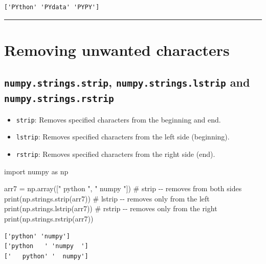 \documentclass[
  english,
  letterpaper,
  DIV=11,
  numbers=noendperiod]{scrreprt}
\newenvironment{Shaded}{\begin{snugshade}}{\end{snugshade}}
\newcommand{\BuiltInTok}[1]{\textcolor[rgb]{0.00,0.23,0.31}{#1}}
\newcommand{\CommentTok}[1]{\textcolor[rgb]{0.37,0.37,0.37}{#1}}
\newcommand{\ImportTok}[1]{\textcolor[rgb]{0.00,0.46,0.62}{#1}}
\newcommand{\NormalTok}[1]{\textcolor[rgb]{0.00,0.23,0.31}{#1}}
\newcommand{\OperatorTok}[1]{\textcolor[rgb]{0.37,0.37,0.37}{#1}}
\newcommand{\StringTok}[1]{\textcolor[rgb]{0.13,0.47,0.30}{#1}}
\providecommand{\tightlist}{%
  \setlength{\itemsep}{0pt}\setlength{\parskip}{0pt}}
\begin{document}
\begin{verbatim}
['PYthon' 'PYdata' 'PYPY']
\end{verbatim}

\begin{center}\rule{0.5\linewidth}{0.5pt}\end{center}

\section{Removing unwanted
characters}\label{removing-unwanted-characters}

\subsection{\texorpdfstring{\texttt{numpy.strings.strip},
\texttt{numpy.strings.lstrip} and
\texttt{numpy.strings.rstrip}}{numpy.strings.strip, numpy.strings.lstrip and numpy.strings.rstrip}}\label{numpy.strings.strip-numpy.strings.lstrip-and-numpy.strings.rstrip}

\begin{itemize}
\tightlist
\item
  \texttt{strip}: Removes specified characters from the beginning and
  end.
\item
  \texttt{lstrip}: Removes specified characters from the left side
  (beginning).
\item
  \texttt{rstrip}: Removes specified characters from the right side
  (end).
\end{itemize}

\begin{Shaded}
\begin{Highlighting}[]
\ImportTok{import}\NormalTok{ numpy }\ImportTok{as}\NormalTok{ np}

\NormalTok{arr7 }\OperatorTok{=}\NormalTok{ np.array([}\StringTok{"   python   "}\NormalTok{, }\StringTok{"  numpy  "}\NormalTok{])}
\CommentTok{\# strip {-}{-} removes from both sides}
\BuiltInTok{print}\NormalTok{(np.strings.strip(arr7))}
\CommentTok{\# lstrip {-}{-} removes only from the left}
\BuiltInTok{print}\NormalTok{(np.strings.lstrip(arr7))}
\CommentTok{\# rstrip {-}{-} removes only from the right}
\BuiltInTok{print}\NormalTok{(np.strings.rstrip(arr7))}
\end{Highlighting}
\end{Shaded}

\begin{verbatim}
['python' 'numpy']
['python   ' 'numpy  ']
['   python' '  numpy']
\end{verbatim}
\end{document}
